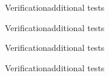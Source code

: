 \documentclass[sans,mathserif,aspectratio=169, 10pt]{beamer}
\begin{document}
\begin{frame}{Verification}{additional tests}
\centering
{}
\end{frame}

\begin{frame}{Verification}{additional tests}
\centering
{}
\end{frame}

\begin{frame}{Verification}{additional tests}
\centering
{}
\end{frame}

\begin{frame}{Verification}{additional tests}
\centering
{}
\end{frame}
\end{document}
